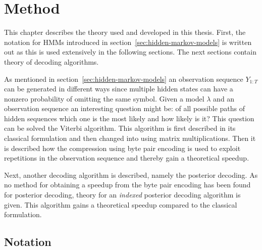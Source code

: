 \chapter{Method}
\label{cha:method}

This chapter describes the theory used and developed in this thesis. First, the
notation for HMMs introduced in section~\ref{sec:hidden-markov-models} is
written out as this is used extensively in the following sections. The next
sections contain theory of decoding algorithms.

As mentioned in section~\ref{sec:hidden-markov-models} an observation sequence
$Y_{1:T}$ can be generated in different ways since multiple hidden states can
have a nonzero probability of omitting the same symbol. Given a model
$\lambda$ and an observation sequence an interesting question might be: of all
possible paths of hidden sequences which one is the most likely and how likely
is it? This question can be solved the Viterbi algorithm. This algorithm is first
described in its classical formulation and then changed into using matrix
multiplications. Then it is described how the compression using byte pair
encoding is used to exploit repetitions in the observation sequence and
thereby gain a theoretical speedup.

Next, another decoding algorithm is described, namely the posterior decoding.
As no method for obtaining a speedup from the byte pair encoding has been found
for posterior decoding, theory for an \emph{indexed} posterior decoding
algorithm is given. This algorithm gains a theoretical speedup compared to the
classical formulation.

\section{Notation}

